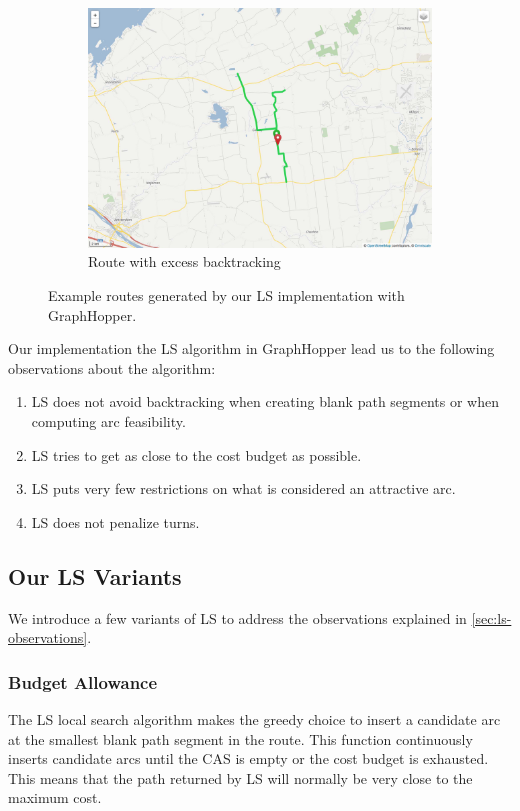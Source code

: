\documentclass[honors]{union-cs-thesis}
\begin{document}
\begin{figure}
\begin{center}
\begin{subfigure}{0.48\linewidth}
\includegraphics[width=\textwidth]{figs/ls-route3}
\caption{Route with excess backtracking}
\label{fig:ls-route3}
\end{subfigure}
\end{center}
\caption[LS example routes]{Example routes generated by our LS implementation with GraphHopper.}
\label{fig:ls-routes}
\end{figure}

Our implementation the LS algorithm in GraphHopper lead us to the following observations about the algorithm:
\begin{enumerate}
    \item LS does not avoid backtracking when creating blank path segments or when computing arc feasibility.\label{obs:backtrack}
    \item LS tries to get as close to the cost budget as possible.\label{obs:budget}
    \item LS puts very few restrictions on what is considered an attractive arc.\label{obs:arc}
    \item LS does not penalize turns.
\end{enumerate}

\subsection{Our LS Variants}
We introduce a few variants of LS to address the observations explained in \cref{sec:ls-observations}.

\subsubsection{Budget Allowance}
The LS local search algorithm makes the greedy choice to insert a candidate arc at the smallest blank path segment in the route. This function continuously inserts candidate arcs until the CAS is empty or the cost budget is exhausted. This means that the path returned by LS will normally be very close to the maximum cost. 
\end{document}
